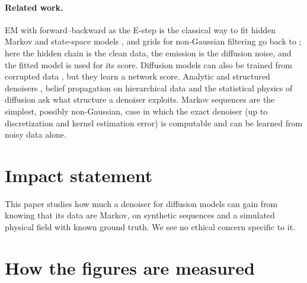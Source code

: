 \documentclass{article}
\begin{document}
\paragraph{Related work.} EM with forward--backward as the E-step is the classical way to fit hidden Markov and
state-space models \cite{baum1970,rabiner1989tutorial,shumway1982em,cappe2005}, and grids for non-Gaussian filtering go
back to \cite{kitagawa1987}; here the hidden chain is the clean data, the emission is the diffusion noise, and the
fitted model is used for its score. Diffusion models can also be trained from corrupted data
\cite{daras2023ambient,rozet2024learning,bai2024em}, but they learn a network score. Analytic and structured denoisers
\cite{kamb2024analytic,kadkhodaie2024generalization}, belief propagation on hierarchical data
\cite{garnierbrun2024transformers,sclocchi2025phase,mei2024unets} and the statistical physics of diffusion
\cite{biroli2023generative,biroli2024dynamical,achilli2025memorization,bonnaire2025memorize,garnierbrun2026biased,garnierbrun2026foam}
ask what structure a denoiser exploits. Markov sequences are the simplest, possibly non-Gaussian, case in which the
exact denoiser (up to discretization and kernel estimation error) is computable and can be learned from noisy data alone.

\section*{Impact statement}
This paper studies how much a denoiser for diffusion models can gain from knowing that its data are Markov, on
synthetic sequences and a simulated physical field with known ground truth. We see no ethical concern specific to it.




\newpage
\appendix
\onecolumn
\let\appendixsection\section
\renewcommand{\section}{\FloatBarrier\appendixsection}
\section{How the figures are measured}
\label{app:measures}
\end{document}
